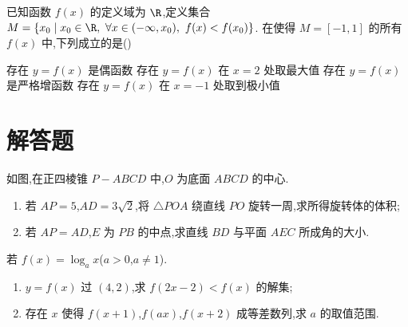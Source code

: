 \begin{problem}
已知函数 \(f(x)\) 的定义域为 \(\R\),定义集合 \(M=\{x_0\mid x_0\in \R,\ \forall x\in(-\infty,x_0),\ f(x)<f(x_0)\}\). 在使得 \(M=[-1,1]\) 的所有 \(f(x)\) 中,下列成立的是(\quad)

\choices
    {存在 \(y=f(x)\) 是偶函数}
    {存在 \(y=f(x)\) 在 \(x=2\) 处取最大值}
    {存在 \(y=f(x)\) 是严格增函数}
    {存在 \(y=f(x)\) 在 \(x=-1\) 处取到极小值}
\end{problem}

\section{解答题}

\begin{problem}
如图,在正四棱锥 \(P-ABCD\) 中,\(O\) 为底面 \(ABCD\) 的中心.

\begin{enumerate}
\item 若 \(AP=5\),\(AD=3\sqrt{2}\),将 \(\triangle POA\) 绕直线 \(PO\) 旋转一周,求所得旋转体的体积;
\item 若 \(AP=AD\),\(E\) 为 \(PB\) 的中点,求直线 \(BD\) 与平面 \(AEC\) 所成角的大小.
\end{enumerate}

\end{problem}

\begin{problem}
若 \(f(x)=\log_a x\)(\(a>0\),\(a\ne 1\)).

\begin{enumerate}
\item \(y=f(x)\) 过 \((4,2)\),求 \(f(2x-2)<f(x)\) 的解集;
\item 存在 \(x\) 使得 \(f(x+1)\),\(f(ax)\),\(f(x+2)\) 成等差数列,求 \(a\) 的取值范围.
\end{enumerate}
\end{problem}

